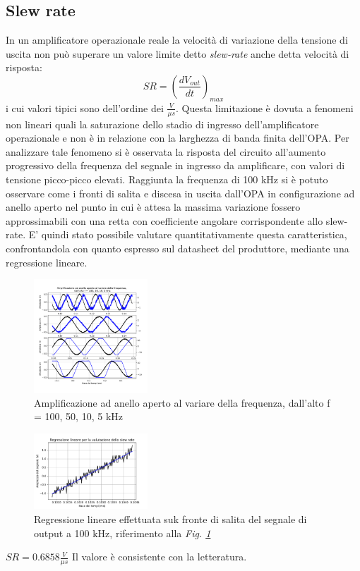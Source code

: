\documentclass[journal]{IEEEtran}
\begin{document}
\subsection{Slew rate}
In un amplificatore operazionale reale la velocità di variazione della tensione di uscita non può superare un valore limite detto \textit{slew-rate} anche detta velocità di risposta:
\[SR = (\frac{dV_{out}}{dt})_{max}\]
i cui valori tipici sono dell'ordine dei $\frac{V}{\mu s}$.
Questa limitazione è dovuta a fenomeni non lineari quali la saturazione dello stadio di ingresso dell'amplificatore operazionale e non è in relazione con la larghezza di banda finita dell'OPA. 
Per analizzare tale fenomeno si è osservata la risposta del circuito all'aumento progressivo della frequenza del segnale in ingresso da amplificare, con valori di tensione picco-picco elevati. Raggiunta la frequenza di 100 kHz si è potuto osservare come i fronti di salita e discesa in uscita dall'OPA in configurazione ad anello aperto nel punto in cui è attesa la massima variazione fossero approssimabili con una retta con coefficiente angolare corrispondente allo slew-rate. E' quindi stato possibile valutare quantitativamente questa caratteristica, confrontandola con quanto espresso sul datasheet del produttore, mediante una regressione lineare.
\begin{figure}[H]%
\begin {center}
\includegraphics[width=0.38\textwidth]{analysis/output/OPA-open-loop-slew-rate.pdf}
\caption{Amplificazione ad anello aperto al variare della frequenza,  dall'alto f = 100, 50, 10, 5 kHz}
\label{fig:slew-rate-table}
\end {center}
\end{figure}


\begin{figure}[H]%
\begin {center}
\includegraphics[width=0.38\textwidth]{analysis/output/OPA-slew-rate-fit.pdf}
\caption{Regressione lineare effettuata suk fronte di salita del segnale di output a 100 kHz, riferimento alla \textit{Fig. \ref{fig:slew-rate-table}}}
\label{fig:slew-rate-fit}
\end {center}
\end{figure}
$SR = 0.6858 \frac{V}{\mu s}$
Il valore è consistente con la letteratura.
\end{document}
